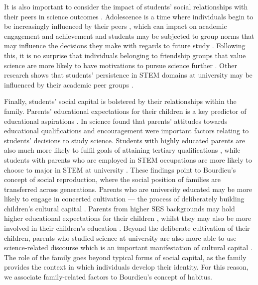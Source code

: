 It is also important to consider the impact of students' social relationships with their peers in science outcomes \cite{osborne2003attitudes}. Adolescence is a time where individuals begin to be increasingly influenced by their peers \cite{douvan1966adolescent}, which can impact on academic engagement and achievement \cite{ryan2000peer} and students may be subjected to group norms that may influence the decisions they make with regards to future study \cite{brown1986perceptions}. Following this, it is no surprise that individuals belonging to friendship groups that value science are more likely to have motivations to pursue science further \cite{robnett2013friendship}. Other research shows that students' persistence in STEM domains at university may be influenced by their academic peer groups \cite{Ost_2010}.

Finally, students' social capital is bolstered by their relationships within the family. Parents' educational expectations for their children is a key predictor of educational aspirations \cite{wu2015early}. In science \cite{Lyons_2006} found that parents' attitudes towards educational qualifications and encouragement were important factors relating to students' decisions to study science. Students with highly educated parents are also much more likely to fulfil goals of attaining tertiary qualifications \cite{reynolds2011change}, while students with parents who are employed in STEM occupations are more likely to choose to major in STEM at university \cite{moakler2014college}. These findings point to Bourdieu's concept of social reproduction, where the social position of families are transferred across generations. Parents who are university educated may be more likely to engage in concerted cultivation --- the process of deliberately building children's cultural capital \cite{lareau2011unequal}. Parents from higher SES backgrounds may hold higher educational expectations for their children \cite{carolan2015does}, whilst they may also be more involved in their children's education \cite{cheadle2011quantitative}. Beyond the deliberate cultivation of their children, parents who studied science at university are also more able to use science-related discourse which is an important manifestation of cultural capital \cite{Lyons_2006,bernstein1971class}. The role of the family goes beyond typical forms of social capital, as the family provides the context in which individuals develop their identity. For this reason, we associate family-related factors to Bourdieu's concept of habitus. 

